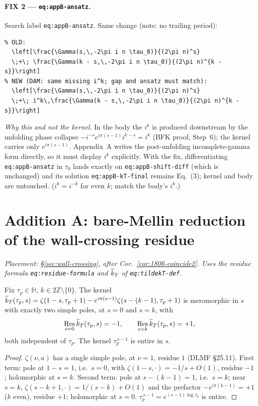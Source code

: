 \documentclass[11pt]{article}
\newcommand{\HH}{\mathbb{H}}\newcommand{\ZZ}{\mathbb{Z}}
\DeclareMathOperator{\Res}{Res}\DeclareMathOperator{\im}{Im}
\begin{document}
\paragraph{FIX 2 --- \texttt{eq:appB-ansatz}.} Search label
\texttt{eq:appB-ansatz}. Same change (note: no trailing period):
\begin{verbatim}
% OLD:
  \left[\frac{\Gamma(s,\,-2\pi i n \tau_0)}{(2\pi n)^s}
  \;+\; \frac{\Gamma(k - s,\,-2\pi i n \tau_0)}{(2\pi n)^{k - s}}\right]
% NEW (DAM: same missing i^k; gap and ansatz must match):
  \left[\frac{\Gamma(s,\,-2\pi i n \tau_0)}{(2\pi n)^s}
  \;+\; i^k\,\frac{\Gamma(k - s,\,-2\pi i n \tau_0)}{(2\pi n)^{k - s}}\right]
\end{verbatim}

\noindent\emph{Why this and not the kernel.} In the body the $i^k$ is
produced downstream by the unfolding phase collapse
$-i^{-s}e^{i\pi(s-1)}i^{k-s}=i^k$ (BFK proof, Step~6); the kernel
carries only $e^{i\pi(s-1)}$. Appendix~A writes the post-unfolding
incomplete-gamma form directly, so it must display $i^k$ explicitly.
With the fix, differentiating \texttt{eq:appB-ansatz} in $\tau_0$ lands
exactly on \texttt{eq:appB-shift-diff} (which is unchanged) and its
solution \texttt{eq:appB-kT-final} remains Eq.~(3); kernel and body are
untouched. ($i^k=i^{-k}$ for even $k$; match the body's $i^k$.)

\section{Addition A: bare-Mellin reduction of the wall-crossing residue}
\noindent\emph{Placement: \S\ref{sec:wall-crossing}, after
Cor.~\ref{cor:1806-coincide2}. Uses the residue formula
\texttt{eq:residue-formula} and $\widetilde{k}_T$ of \texttt{eq:tildekT-def}.}

\begin{lemma}\label{new:kT-poles}
Fix $\tau_p\in\HH$, $k\in 2\ZZ\setminus\{0\}$. The kernel
$\widetilde{k}_T(\tau_p,s)=\zeta(1-s,\tau_p+1)-e^{i\pi(s-1)}\zeta(s-(k-1),\tau_p+1)$
is meromorphic in $s$ with exactly two simple poles, at $s=0$ and
$s=k$, with
\[
  \Res_{s=0}\ktil(\tau_p,s)=-1,\qquad \Res_{s=k}\ktil(\tau_p,s)=+1,
\]
both independent of $\tau_p$. The kernel $\tau_p^{\,s-1}$ is entire in $s$.
\end{lemma}
\begin{proof}
$\zeta(\nu,a)$ has a single simple pole, at $\nu=1$, residue $1$
(DLMF \S25.11). First term: pole at $1-s=1$, i.e.\ $s=0$, with
$\zeta(1-s,\cdot)=-1/s+O(1)$, residue $-1$; holomorphic at $s=k$.
Second term: pole at $s-(k-1)=1$, i.e.\ $s=k$; near $s=k$,
$\zeta(s-k+1,\cdot)=1/(s-k)+O(1)$ and the prefactor
$-e^{i\pi(k-1)}=+1$ ($k$ even), residue $+1$; holomorphic at $s=0$.
$\tau_p^{\,s-1}=e^{(s-1)\log\tau_p}$ is entire.
\end{proof}
\end{document}
